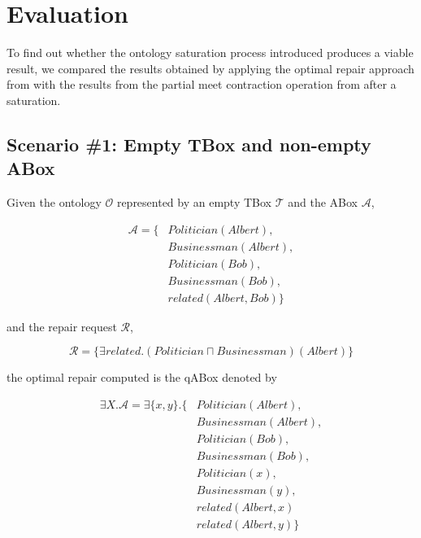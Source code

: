 
\chapter{Evaluation}
\label{chap:evaluation}

To find out whether the ontology saturation process introduced produces a viable result, we compared the results obtained by applying the optimal repair approach from \citep{Baader-CADE2021} with the results from the partial meet contraction operation from \citep{Matos2021} after a saturation.

\section{Scenario \#1: Empty TBox and non-empty ABox}
\label{sec:scenario-1}

Given the ontology $\mathcal{O}$ represented by an empty TBox $\mathcal{T}$ and the ABox $\mathcal{A}$,

\begin{equation*}
    \begin{aligned}
        \mathcal{A} = \{ & Politician(Albert),  \\
                         & Businessman(Albert), \\
                         & Politician(Bob),     \\
                         & Businessman(Bob),    \\
                         & related(Albert, Bob) \}
    \end{aligned}
\end{equation*}

and the repair request $\mathcal{R}$,

$$\mathcal{R} = \{\exists related.(Politician \sqcap Businessman)(Albert) \}$$

the optimal repair computed is the qABox denoted by

\begin{equation*}
    \begin{aligned}
        \exists X.\mathcal{A} = \exists \{ x, y \}.\{ & Politician(Albert),  \\
                                                      & Businessman(Albert), \\
                                                      & Politician(Bob),     \\
                                                      & Businessman(Bob),    \\ 
                                                      & Politician(x),       \\
                                                      & Businessman(y),      \\
                                                      & related(Albert, x)   \\
                                                      & related(Albert, y)   \}
    \end{aligned}
\end{equation*}

